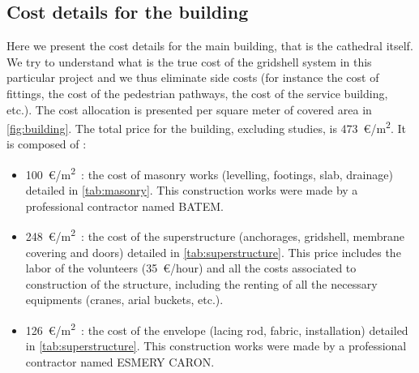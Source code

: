 
\subsection{Cost details for the building}\label{sec=gs_cost}
Here we present the cost details for the main building, that is the cathedral itself. We try to understand what is the true cost of the gridshell system in this particular project and we thus eliminate side costs (for instance the cost of fittings, the cost of the pedestrian pathways, the cost of the service building, etc.). The cost allocation is presented per square meter of covered area in \cref{fig:building}. The total price for the building, excluding studies, is 473~€/m\textsuperscript{2}. It is composed of :
\begin{itemize}
\item  100~€/m\textsuperscript{2}~: the cost of masonry works (levelling, footings, slab, drainage) detailed in \cref{tab:masonry}. This construction works were made by a professional contractor named BATEM.
\item  248~€/m\textsuperscript{2}~: the cost of the superstructure (anchorages, gridshell, membrane covering and doors) detailed in \cref{tab:superstructure}. This price includes the labor of the volunteers (35~€/hour) and all the costs associated to construction of the structure, including the renting of all the necessary equipments (cranes, arial buckets, etc.).
\item  126~€/m\textsuperscript{2}~: the cost of the envelope (lacing rod, fabric, installation) detailed in \cref{tab:superstructure}. This construction works were made by a professional contractor named ESMERY CARON.
\end{itemize}

